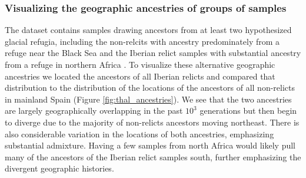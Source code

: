 \documentclass[12pt]{article}
\begin{document}
\subsubsection*{Visualizing the geographic ancestries of groups of samples}

The dataset contains samples drawing ancestors from at least two hypothesized glacial refugia, including the non-relcits with ancestry predominately from a refuge near the Black Sea \citep{lee2017post,hsu2019postglacial} and the Iberian relict samples with substantial ancestry from a refuge in northern Africa \citep{alonso2016,durvasula2017african,fulgione2018madeiran}. To visualize these alternative geographic ancestries we located the ancestors of all Iberian relicts and compared that distribution to the distribution of the locations of the ancestors of all non-relicts in mainland Spain (Figure \ref{fig:thal_ancestries}). We see that the two ancestries are largely geographically overlapping in the past $10^3$ generations but then begin to diverge due to the majority of non-relicts ancestors moving northeast. There is also considerable variation in the locations of both ancestries, emphasizing substantial admixture. Having a few samples from north Africa would likely pull many of the ancestors of the Iberian relict samples south, further emphasizing the divergent geographic histories.

\end{document}
